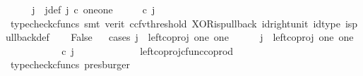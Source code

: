 \begin{isabellebody}
\ \ \isamarkupfalse%
\ \isamarkupfalse%
\ j\ \ j{\isacharunderscore}{\kern0pt}def{\isacharcolon}{\kern0pt}\ {\isachardoublequoteopen}j\ {\isasymin}\isactrlsub c\ one{\isasymCoprod}one\ {\isasymand}\ {\isacharparenleft}{\kern0pt}{\isasymlangle}{\isasymt}{\isacharcomma}{\kern0pt}\ {\isasymf}{\isasymrangle}\ {\isasymamalg}{\isasymlangle}{\isasymf}{\isacharcomma}{\kern0pt}\ {\isasymt}{\isasymrangle}{\isacharparenright}{\kern0pt}\ {\isasymcirc}\isactrlsub c\ j\ \ {\isacharequal}{\kern0pt}\ {\isasymlangle}{\isasymt}{\isacharcomma}{\kern0pt}{\isasymt}{\isasymrangle}{\isachardoublequoteclose}\isanewline
\ \ \ \ \isamarkupfalse%
\ {\isacharparenleft}{\kern0pt}typecheck{\isacharunderscore}{\kern0pt}cfuncs{\isacharcomma}{\kern0pt}\ smt\ {\isacharparenleft}{\kern0pt}verit{\isacharcomma}{\kern0pt}\ ccfv{\isacharunderscore}{\kern0pt}threshold{\isacharparenright}{\kern0pt}\ XOR{\isacharunderscore}{\kern0pt}is{\isacharunderscore}{\kern0pt}pullback\ id{\isacharunderscore}{\kern0pt}right{\isacharunderscore}{\kern0pt}unit{}\ id{\isacharunderscore}{\kern0pt}type\ is{\isacharunderscore}{\kern0pt}pullback{\isacharunderscore}{\kern0pt}def{\isacharparenright}{\kern0pt}\isanewline
\ \ \isamarkupfalse%
\ False\isanewline
\ \ \isamarkupfalse%
{\isacharparenleft}{\kern0pt}cases\ {\isachardoublequoteopen}j\ {\isacharequal}{\kern0pt}\ left{\isacharunderscore}{\kern0pt}coproj\ one\ one{\isachardoublequoteclose}{\isacharparenright}{\kern0pt}\isanewline
\ \ \ \ \isamarkupfalse%
\ {\isachardoublequoteopen}j\ {\isacharequal}{\kern0pt}\ left{\isacharunderscore}{\kern0pt}coproj\ one\ one{\isachardoublequoteclose}\isanewline
\ \ \ \ \isamarkupfalse%
\ \isamarkupfalse%
\ {\isachardoublequoteopen}{\isacharparenleft}{\kern0pt}{\isasymlangle}{\isasymt}{\isacharcomma}{\kern0pt}\ {\isasymf}{\isasymrangle}\ {\isasymamalg}{\isasymlangle}{\isasymf}{\isacharcomma}{\kern0pt}\ {\isasymt}{\isasymrangle}{\isacharparenright}{\kern0pt}\ {\isasymcirc}\isactrlsub c\ j\ \ {\isacharequal}{\kern0pt}\ {\isasymlangle}{\isasymt}{\isacharcomma}{\kern0pt}\ {\isasymf}{\isasymrangle}{\isachardoublequoteclose}\isanewline
\ \ \ \ \ \ \isamarkupfalse%
\ \ left{\isacharunderscore}{\kern0pt}coproj{\isacharunderscore}{\kern0pt}cfunc{\isacharunderscore}{\kern0pt}coprod\ \isamarkupfalse%
\ {\isacharparenleft}{\kern0pt}typecheck{\isacharunderscore}{\kern0pt}cfuncs{\isacharcomma}{\kern0pt}\ presburger{\isacharparenright}{\kern0pt}\isanewline

\end{isabellebody}
